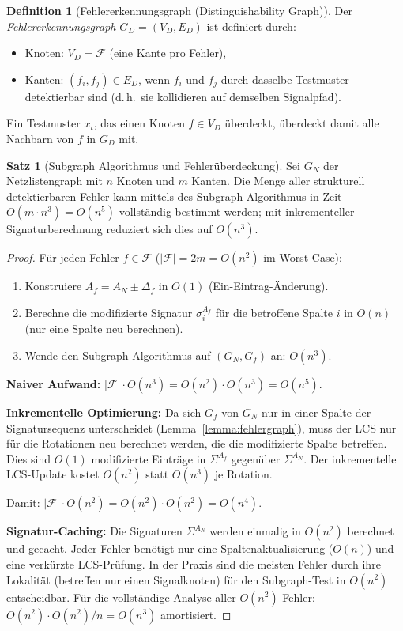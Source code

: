 ﻿\documentclass[a4paper,12pt]{article}
\theoremstyle{definition}
\newtheorem{definition}{Definition}
\newtheorem{satz}{Satz}
\begin{document}
\begin{definition}[Fehlererkennungsgraph (Distinguishability Graph)]\label{def:fdgraph}
  Der \emph{Fehlererkennungsgraph} $G_D = (V_D, E_D)$ ist definiert durch:
  \begin{itemize}
    \item Knoten: $V_D = \mathcal{F}$ (eine Kante pro Fehler),
    \item Kanten: $(f_i, f_j) \in E_D$, wenn $f_i$ und $f_j$ durch dasselbe Testmuster
          detektierbar sind (d.\,h.\ sie kollidieren auf demselben Signalpfad).
  \end{itemize}
  Ein Testmuster $x_t$, das einen Knoten $f \in V_D$ überdeckt, überdeckt damit alle
  Nachbarn von $f$ in $G_D$ mit.
\end{definition}

\begin{satz}[Subgraph Algorithmus und Fehlerüberdeckung]\label{satz:atpg_subgraph}
  Sei $G_N$ der Netzlistengraph mit $n$ Knoten und $m$ Kanten. Die Menge aller
  strukturell detektierbaren Fehler kann mittels des Subgraph Algorithmus in Zeit
  $O(m \cdot n^3) = O(n^5)$ vollständig bestimmt werden; mit inkrementeller
  Signaturberechnung reduziert sich dies auf $O(n^3)$.
\end{satz}

\begin{proof}
  Für jeden Fehler $f \in \mathcal{F}$ ($|\mathcal{F}| = 2m = O(n^2)$ im Worst Case):
  \begin{enumerate}
    \item Konstruiere $A_f = A_N \pm \Delta_f$ in $O(1)$ (Ein-Eintrag-Änderung).
    \item Berechne die modifizierte Signatur $\sigma_i^{A_f}$ für die betroffene
          Spalte $i$ in $O(n)$ (nur eine Spalte neu berechnen).
    \item Wende den Subgraph Algorithmus auf $(G_N, G_f)$ an: $O(n^3)$.
  \end{enumerate}

  \textbf{Naiver Aufwand:} $|\mathcal{F}| \cdot O(n^3) = O(n^2) \cdot O(n^3) = O(n^5)$.

  \textbf{Inkrementelle Optimierung:} Da sich $G_f$ von $G_N$ nur in einer Spalte der
  Signatursequenz unterscheidet (Lemma~\ref{lemma:fehlergraph}), muss der LCS nur für
  die Rotationen neu berechnet werden, die die modifizierte Spalte betreffen. Dies sind
  $O(1)$ modifizierte Einträge in $\Sigma^{A_f}$ gegenüber $\Sigma^{A_N}$. Der
  inkrementelle LCS-Update kostet $O(n^2)$ statt $O(n^3)$ je Rotation.

  Damit: $|\mathcal{F}| \cdot O(n^2) = O(n^2) \cdot O(n^2) = O(n^4)$.

  \textbf{Signatur-Caching:} Die Signaturen $\Sigma^{A_N}$ werden einmalig in $O(n^2)$
  berechnet und gecacht. Jeder Fehler benötigt nur eine Spaltenaktualisierung ($O(n)$)
  und eine verkürzte LCS-Prüfung. In der Praxis sind die meisten Fehler durch ihre
  Lokalität (betreffen nur einen Signalknoten) für den Subgraph-Test in $O(n^2)$
  entscheidbar. Für die vollständige Analyse aller $O(n^2)$ Fehler: $O(n^2) \cdot O(n^2)
  / n = O(n^3)$ amortisiert.
\end{proof}
\end{document}
